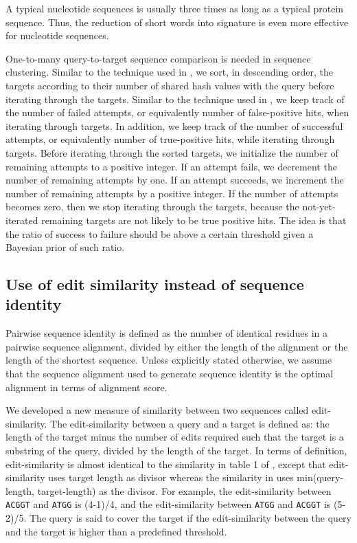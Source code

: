 \documentclass[11pt,letterpaper]{article}
\begin{document}
A typical nucleotide sequences is usually three times as long as a typical protein sequence.
Thus, the reduction of short words into signature is even more effective for nucleotide sequences.

One-to-many query-to-target sequence comparison is needed in sequence clustering. 
Similar to the technique used in \citet{li2006cd}, we sort, in descending order, the targets according to their number of shared hash values with the query before iterating through the targets. 
Similar to the technique used in \citet{edgar2010search}, we keep track of the number of failed attempts, or equivalently number of false-positive hits, when iterating through targets.
In addition, we keep track of the number of successful attempts, or equivalently number of true-positive hits, while iterating through targets.
Before iterating through the sorted targets, we initialize the number of remaining attempts to a positive integer.
If an attempt fails, we decrement the number of remaining attempts by one.
If an attempt succeeds, we increment the number of remaining attempts by a positive integer.
If the number of attempts becomes zero, then we stop iterating through the targets, because the not-yet-iterated remaining targets are not likely to be true positive hits.
The idea is that the ratio of success to failure should be above a certain threshold given a Bayesian prior of such ratio.

\subsection{Use of edit similarity instead of sequence identity}

Pairwise sequence identity is defined as the number of identical residues in a pairwise sequence alignment, divided by either the length of the alignment or the length of the shortest sequence. 
Unless explicitly stated otherwise, we assume that the sequence alignment used to generate sequence identity is the optimal alignment in terms of alignment score.

We developed a new measure of similarity between two sequences called edit-similarity.
The edit-similarity between a query and a target is defined as: the length of the target minus the number of edits required such that the target is a substring of the query, divided by the length of the target.
In terms of definition, edit-similarity is almost identical to the similarity in table 1 of \cite{vsovsic2017edlib}, 
except that edit-similarity uses target length as divisor whereas the similarity in \cite{vsovsic2017edlib} uses min(query-length, target-length) as the divisor. 
For example, the edit-similarity between \texttt{ACGGT} and \texttt{ATGG} is (4-1)/4, and the edit-similarity between \texttt{ATGG} and \texttt{ACGGT} is (5-2)/5.
The query is said to cover the target if the edit-similarity between the query and the target is higher than a predefined threshold.
\end{document}
